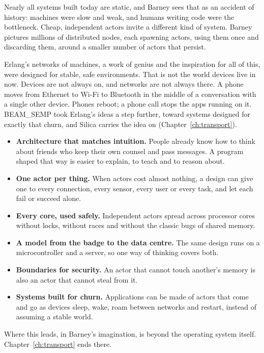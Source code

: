Nearly all systems built today are static, and Barney sees that as an accident
of history: machines were slow and weak, and humans writing code were the
bottleneck. Cheap, independent actors invite a different kind of system. Barney
pictures millions of distributed nodes, each spawning actors, using them once
and discarding them, around a smaller number of actors that persist.

Erlang's networks of machines, a work of genius and the inspiration for all of
this, were designed for stable, safe environments. That is not the world
devices live in now. Devices are not always on, and networks are not always
there. A phone moves from Ethernet to Wi-Fi to Bluetooth in the middle of a
conversation with a single other device. Phones reboot; a phone call stops the
apps running on it. BEAM\_SEMP took Erlang's ideas a step further, toward
systems designed for exactly that churn, and Silica carries the idea on
(Chapter~\ref{ch:transport}).

\begin{itemize}
  \item \textbf{Architecture that matches intuition.} People already know how
        to think about friends who keep their own counsel and pass messages.
        A program shaped that way is easier to explain, to teach and to
        reason about.
  \item \textbf{One actor per thing.} When actors cost almost nothing, a
        design can give one to every connection, every sensor, every user or
        every task, and let each fail or succeed alone.
  \item \textbf{Every core, used safely.} Independent actors spread across
        processor cores without locks, without races and without the classic
        bugs of shared memory.
  \item \textbf{A model from the badge to the data centre.} The same design
        runs on a microcontroller and a server, so one way of thinking
        covers both.
  \item \textbf{Boundaries for security.} An actor that cannot touch another's
        memory is also an actor that cannot steal from it.
  \item \textbf{Systems built for churn.} Applications can be made of actors
        that come and go as devices sleep, wake, roam between networks and
        restart, instead of assuming a stable world.
\end{itemize}

Where this leads, in Barney's imagination, is beyond the operating system
itself. Chapter~\ref{ch:transport} ends there.
